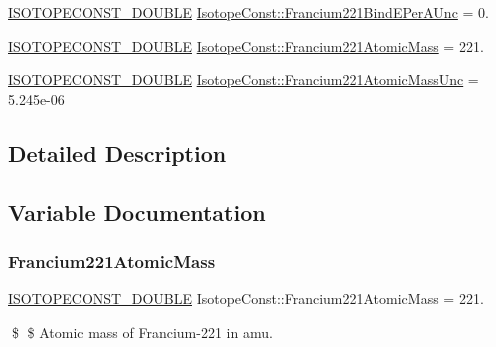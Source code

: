 \begin{DoxyCompactItemize}
\mbox{\hyperlink{group___isotope_const-_macros_ga8f45a7272ce02c0b4c65c44636ed719a}{I\+S\+O\+T\+O\+P\+E\+C\+O\+N\+S\+T\+\_\+\+D\+O\+U\+B\+LE}} \mbox{\hyperlink{group___isotope_const-_francium-_fr221_ga1113543d5ff7dee35d0eaea20eddd276}{Isotope\+Const\+::\+Francium221\+Bind\+E\+Per\+A\+Unc}} = 0.
\item 
\mbox{\hyperlink{group___isotope_const-_macros_ga8f45a7272ce02c0b4c65c44636ed719a}{I\+S\+O\+T\+O\+P\+E\+C\+O\+N\+S\+T\+\_\+\+D\+O\+U\+B\+LE}} \mbox{\hyperlink{group___isotope_const-_francium-_fr221_ga8e4bba18e1cea9d684d0a06c2ab99d26}{Isotope\+Const\+::\+Francium221\+Atomic\+Mass}} = 221.
\item 
\mbox{\hyperlink{group___isotope_const-_macros_ga8f45a7272ce02c0b4c65c44636ed719a}{I\+S\+O\+T\+O\+P\+E\+C\+O\+N\+S\+T\+\_\+\+D\+O\+U\+B\+LE}} \mbox{\hyperlink{group___isotope_const-_francium-_fr221_ga2e5d68f6eb1d9e5f4e209c3d1e3a9cb3}{Isotope\+Const\+::\+Francium221\+Atomic\+Mass\+Unc}} = 5.\+245e-\/06
\end{DoxyCompactItemize}


\subsection{Detailed Description}


\subsection{Variable Documentation}
\mbox{\label{group___isotope_const-_francium-_fr221_ga8e4bba18e1cea9d684d0a06c2ab99d26}} 
\subsubsection{\texorpdfstring{Francium221\+Atomic\+Mass}{Francium221AtomicMass}}
{\footnotesize\ttfamily \mbox{\hyperlink{group___isotope_const-_macros_ga8f45a7272ce02c0b4c65c44636ed719a}{I\+S\+O\+T\+O\+P\+E\+C\+O\+N\+S\+T\+\_\+\+D\+O\+U\+B\+LE}} Isotope\+Const\+::\+Francium221\+Atomic\+Mass = 221.}

\$ \$ Atomic mass of Francium-\/221 in amu. \mbox{\label{group___isotope_const-_francium-_fr221_ga2e5d68f6eb1d9e5f4e209c3d1e3a9cb3}} 
